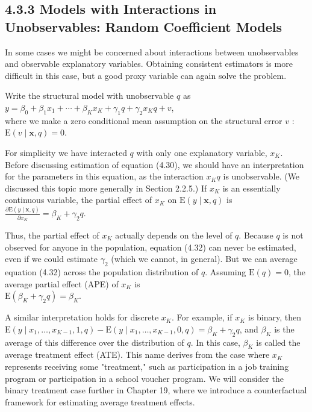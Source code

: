 \documentclass[10pt]{article}
\begin{document}
\subsection*{4.3.3 Models with Interactions in Unobservables: Random Coefficient Models}
In some cases we might be concerned about interactions between unobservables and observable explanatory variables. Obtaining consistent estimators is more difficult in this case, but a good proxy variable can again solve the problem.

Write the structural model with unobservable $q$ as\\
$y=\beta_{0}+\beta_{1} x_{1}+\cdots+\beta_{K} x_{K}+\gamma_{1} q+\gamma_{2} x_{K} q+v$,\\
where we make a zero conditional mean assumption on the structural error $v$ :\\
$\mathrm{E}(v \mid \mathbf{x}, q)=0$.

For simplicity we have interacted $q$ with only one explanatory variable, $x_{K}$.\\
Before discussing estimation of equation (4.30), we should have an interpretation for the parameters in this equation, as the interaction $x_{K} q$ is unobservable. (We discussed this topic more generally in Section 2.2.5.) If $x_{K}$ is an essentially continuous variable, the partial effect of $x_{K}$ on $\mathrm{E}(y \mid \mathbf{x}, q)$ is\\
$\frac{\partial \mathrm{E}(y \mid \mathbf{x}, q)}{\partial x_{K}}=\beta_{K}+\gamma_{2} q$.

Thus, the partial effect of $x_{K}$ actually depends on the level of $q$. Because $q$ is not observed for anyone in the population, equation (4.32) can never be estimated, even if we could estimate $\gamma_{2}$ (which we cannot, in general). But we can average equation (4.32) across the population distribution of $q$. Assuming $\mathrm{E}(q)=0$, the average partial effect (APE) of $x_{K}$ is\\
$\mathrm{E}\left(\beta_{K}+\gamma_{2} q\right)=\beta_{K}$.

A similar interpretation holds for discrete $x_{K}$. For example, if $x_{K}$ is binary, then $\mathrm{E}\left(y \mid x_{1}, \ldots, x_{K-1}, 1, q\right)-\mathrm{E}\left(y \mid x_{1}, \ldots, x_{K-1}, 0, q\right)=\beta_{K}+\gamma_{2} q$, and $\beta_{K}$ is the average of this difference over the distribution of $q$. In this case, $\beta_{K}$ is called the average treatment effect (ATE). This name derives from the case where $x_{K}$ represents receiving some "treatment," such as participation in a job training program or participation in a school voucher program. We will consider the binary treatment case further in Chapter 19, where we introduce a counterfactual framework for estimating average treatment effects.
\end{document}
